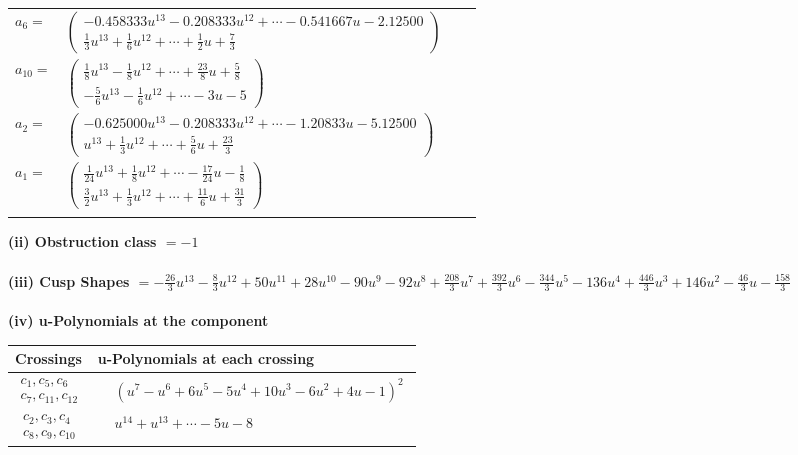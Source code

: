 \documentclass[1p]{elsarticle_modified}
\theoremstyle{definition}
\begin{document}
\begin{tabular}{m{7pt} m{180pt} m{7pt} m{180pt} }
\flushright $a_{6}=$&$\begin{pmatrix}-0.458333 u^{13}-0.208333 u^{12}+\cdots-0.541667 u-2.12500\\\frac{1}{3} u^{13}+\frac{1}{6} u^{12}+\cdots+\frac{1}{2} u+\frac{7}{3}\end{pmatrix}$ \\
\flushright $a_{10}=$&$\begin{pmatrix}\frac{1}{8} u^{13}-\frac{1}{8} u^{12}+\cdots+\frac{23}{8} u+\frac{5}{8}\\-\frac{5}{6} u^{13}-\frac{1}{6} u^{12}+\cdots-3 u-5\end{pmatrix}$ \\
\flushright $a_{2}=$&$\begin{pmatrix}-0.625000 u^{13}-0.208333 u^{12}+\cdots-1.20833 u-5.12500\\u^{13}+\frac{1}{3} u^{12}+\cdots+\frac{5}{6} u+\frac{23}{3}\end{pmatrix}$ \\
\flushright $a_{1}=$&$\begin{pmatrix}\frac{1}{24} u^{13}+\frac{1}{8} u^{12}+\cdots-\frac{17}{24} u-\frac{1}{8}\\\frac{3}{2} u^{13}+\frac{1}{3} u^{12}+\cdots+\frac{11}{6} u+\frac{31}{3}\end{pmatrix}$\\&\end{tabular}
\flushleft \textbf{(ii) Obstruction class $= -1$}\\~\\
\flushleft \textbf{(iii) Cusp Shapes $= -\frac{26}{3} u^{13}-\frac{8}{3} u^{12}+50 u^{11}+28 u^{10}-90 u^9-92 u^8+\frac{208}{3} u^7+\frac{392}{3} u^6-\frac{344}{3} u^5-136 u^4+\frac{446}{3} u^3+146 u^2-\frac{46}{3} u-\frac{158}{3}$}\\~\\
\newpage\renewcommand{\arraystretch}{1}
\flushleft \textbf{(iv) u-Polynomials at the component}\newline \\
\begin{tabular}{m{50pt}|m{274pt}}
Crossings & \hspace{64pt}u-Polynomials at each crossing \\
\hline $$\begin{aligned}c_{1},c_{5},c_{6}\\c_{7},c_{11},c_{12}\end{aligned}$$&$\begin{aligned}
&(u^7- u^6+6 u^5-5 u^4+10 u^3-6 u^2+4 u-1)^2
\end{aligned}$\\
\hline $$\begin{aligned}c_{2},c_{3},c_{4}\\c_{8},c_{9},c_{10}\end{aligned}$$&$\begin{aligned}
&u^{14}+u^{13}+\cdots-5 u-8
\end{aligned}$\\
\hline
\end{tabular}\\~\\
\end{document}
